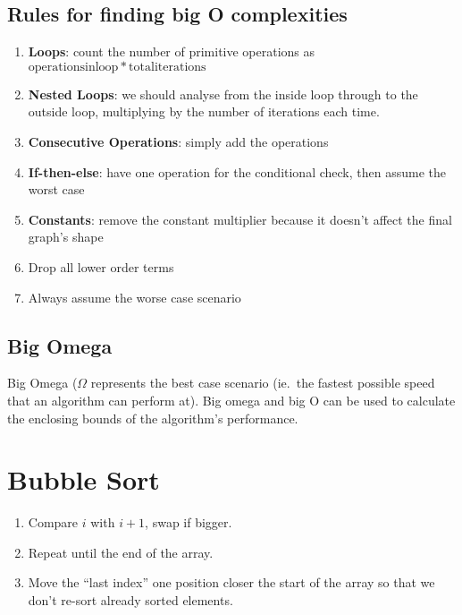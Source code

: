 \subsection{Rules for finding big O complexities}\label{sub:rules_for_finding_big_o_complexities}

\begin{enumerate}
    \item \textbf{Loops}: count the number of primitive operations as \(\mathrm{operations in loop} * \mathrm{total iterations}\)
    \item \textbf{Nested Loops}: we should analyse from the inside loop through to the outside loop, multiplying by the number of iterations each time.
    \item \textbf{Consecutive Operations}: simply add the operations
    \item \textbf{If-then-else}: have one operation for the conditional check, then assume the worst case
    \item \textbf{Constants}: remove the constant multiplier because it doesn't affect the final graph's shape
    \item Drop all lower order terms
    \item Always assume the worse case scenario
\end{enumerate}

\subsection{Big Omega}\label{sub:big_omega}

Big Omega (\(\Omega\) represents the best case scenario (ie.\ the fastest possible speed that an algorithm can perform at).
Big omega and big O can be used to calculate the enclosing bounds of the algorithm's performance.

\section{Bubble Sort}\label{sec:bubble_sort}

\begin{enumerate}
    \item Compare \(i\) with \(i+1\), swap if bigger.
    \item Repeat until the end of the array.
    \item Move the ``last index'' one position closer the start of the array so that we don't re-sort already sorted elements.
\end{enumerate}

